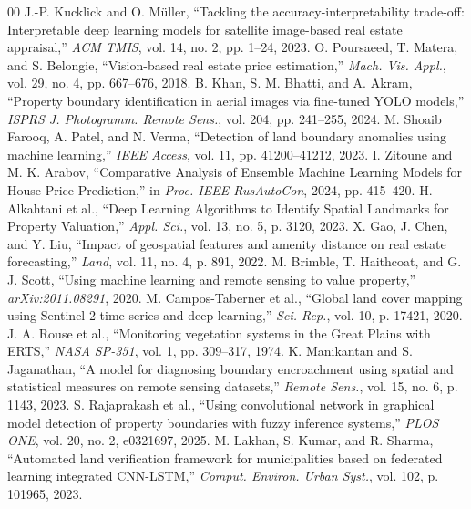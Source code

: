 \documentclass[conference]{IEEEtran}
\begin{document}
\begin{thebibliography}{00}
 J.-P. Kucklick and O. Müller, ``Tackling the accuracy-interpretability trade-off: Interpretable deep learning models for satellite image-based real estate appraisal,'' \textit{ACM TMIS}, vol. 14, no. 2, pp. 1--24, 2023.
 O. Poursaeed, T. Matera, and S. Belongie, ``Vision-based real estate price estimation,'' \textit{Mach. Vis. Appl.}, vol. 29, no. 4, pp. 667--676, 2018.
 B. Khan, S. M. Bhatti, and A. Akram, ``Property boundary identification in aerial images via fine-tuned YOLO models,'' \textit{ISPRS J. Photogramm. Remote Sens.}, vol. 204, pp. 241--255, 2024.
 M. Shoaib Farooq, A. Patel, and N. Verma, ``Detection of land boundary anomalies using machine learning,'' \textit{IEEE Access}, vol. 11, pp. 41200--41212, 2023.
 I. Zitoune and M. K. Arabov, ``Comparative Analysis of Ensemble Machine Learning Models for House Price Prediction,'' in \textit{Proc. IEEE RusAutoCon}, 2024, pp. 415--420.
 H. Alkahtani et al., ``Deep Learning Algorithms to Identify Spatial Landmarks for Property Valuation,'' \textit{Appl. Sci.}, vol. 13, no. 5, p. 3120, 2023.
 X. Gao, J. Chen, and Y. Liu, ``Impact of geospatial features and amenity distance on real estate forecasting,'' \textit{Land}, vol. 11, no. 4, p. 891, 2022.
 M. Brimble, T. Haithcoat, and G. J. Scott, ``Using machine learning and remote sensing to value property,'' \textit{arXiv:2011.08291}, 2020.
 M. Campos-Taberner et al., ``Global land cover mapping using Sentinel-2 time series and deep learning,'' \textit{Sci. Rep.}, vol. 10, p. 17421, 2020.
 J. A. Rouse et al., ``Monitoring vegetation systems in the Great Plains with ERTS,'' \textit{NASA SP-351}, vol. 1, pp. 309--317, 1974.
 K. Manikantan and S. Jaganathan, ``A model for diagnosing boundary encroachment using spatial and statistical measures on remote sensing datasets,'' \textit{Remote Sens.}, vol. 15, no. 6, p. 1143, 2023.
 S. Rajaprakash et al., ``Using convolutional network in graphical model detection of property boundaries with fuzzy inference systems,'' \textit{PLOS ONE}, vol. 20, no. 2, e0321697, 2025.
 M. Lakhan, S. Kumar, and R. Sharma, ``Automated land verification framework for municipalities based on federated learning integrated CNN-LSTM,'' \textit{Comput. Environ. Urban Syst.}, vol. 102, p. 101965, 2023.
\end{thebibliography}
\end{document}
